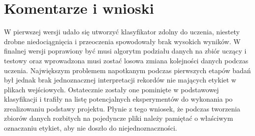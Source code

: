 \documentclass[a4paper,12pt]{article}
\begin{document}
\section{Komentarze i wnioski}
\hspace{1cm}W pierwszej wersji udało się utworzyć klasyfikator zdolny do uczenia, niestety drobne niedociągnięcia i przeoczenia spowodowały brak wysokich wyników. W finalnej wersji poprawiony być musi algorytm podziału danych na zbiór uczący i testowy oraz wprowadzona musi zostać losowa zmiana kolejności danych podczas uczenia.
\hspace{1cm}Największym problemem napotkanym podczas pierwszych etapów badań był jednak brak jednoznacznej interpretacji rekordów nie mających etykiet w plikach wejściowych. Ostatecznie zostały one pominięte w podstawowej klasyfikacji i trafiły na listę potencjalnych eksperymentów do wykonania po zrealizowaniu podstawy projektu. Płynie z tego wniosek, że podczas tworzenia zbiorów danych rozbitych na pojedyncze pliki należy pamiętać o właściwym oznaczaniu etykiet, aby nie doszło do niejednoznaczności.
\end{document}
